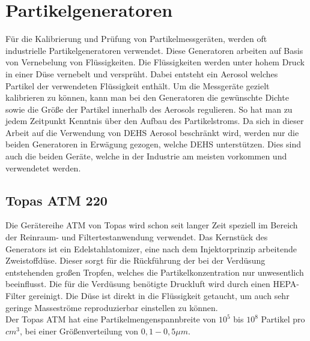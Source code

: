 \section{Partikelgeneratoren}
F\"{u}r die Kalibrierung und Pr\"{u}fung von Partikelmessger\"{a}ten, werden oft industrielle Partikelgeneratoren verwendet. Diese Generatoren arbeiten auf Basis von Vernebelung von Fl\"{u}ssigkeiten. Die Fl\"{u}ssigkeiten werden unter hohem Druck in einer D\"{u}se vernebelt und verspr\"{u}ht. Dabei entsteht ein Aerosol welches Partikel der verwendeten Fl\"{u}ssigkeit enth\"{a}lt. Um die Messger\"{a}te gezielt kalibrieren zu k\"{o}nnen, kann man bei den Generatoren die gew\"{u}nschte Dichte sowie die Gr\"{o}{\ss}e der Partikel innerhalb des Aerosols regulieren. So hat man zu jedem Zeitpunkt Kenntnis \"{u}ber den Aufbau des Partikelstroms. Da sich in dieser Arbeit auf die Verwendung von DEHS Aerosol beschr\"{a}nkt wird, werden nur die beiden Generatoren in Erw\"{a}gung gezogen, welche DEHS unterst\"{u}tzen. Dies sind auch die beiden Ger\"{a}te, welche in der Industrie am meisten vorkommen und verwendetet werden.

\subsection{Topas ATM 220}
Die Ger\"{a}tereihe ATM von Topas wird schon seit langer Zeit speziell im Bereich der Reinraum- und Filtertestanwendung verwendet. Das Kernst\"{u}ck des Generators ist ein Edelstahlatomizer, eine nach dem Injektorprinzip arbeitende Zweistoffd\"{u}se. Dieser sorgt f\"{u}r die R\"{u}ckf\"{u}hrung der bei der Verd\"{u}sung entstehenden gro{\ss}en Tropfen, welches die Partikelkonzentration nur unwesentlich beeinflusst. Die f\"{u}r die Verd\"{u}sung ben\"{o}tigte Druckluft wird durch einen HEPA-Filter gereinigt. Die D\"{u}se ist direkt in die Fl\"{u}ssigkeit getaucht, um auch sehr geringe Massestr\"{o}me reproduzierbar einstellen zu k\"{o}nnen.\\
Der Topas ATM hat eine Partikelmengenspannbreite  von \(10^5\) bis \(10^8\) Partikel pro \(cm^3\), bei einer Gr\"{o}{\ss}enverteilung von \(0,1 - 0,5 \mu m\).

